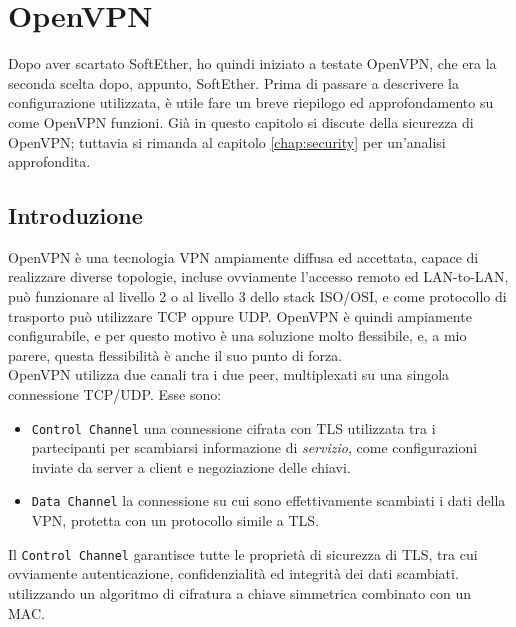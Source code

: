 \section{OpenVPN}
Dopo aver scartato SoftEther, ho quindi iniziato a testate OpenVPN, che era la
seconda scelta dopo, appunto, SoftEther. Prima di passare a descrivere la configurazione
utilizzata, è utile fare un breve riepilogo ed approfondamento su come OpenVPN
funzioni. Già in questo capitolo si discute della sicurezza di OpenVPN; tuttavia
si rimanda al capitolo \ref{chap:security} per un'analisi approfondita.

\subsection{Introduzione}
OpenVPN è una tecnologia VPN ampiamente diffusa ed accettata, capace di realizzare
diverse topologie, incluse ovviamente l'accesso remoto ed LAN-to-LAN, può funzionare
al livello 2 o al livello 3 dello stack ISO/OSI, e come protocollo di trasporto
può utilizzare TCP oppure UDP. OpenVPN è quindi ampiamente configurabile, e per questo
motivo è una soluzione molto flessibile, e, a mio parere, questa flessibilità è anche
il suo punto di forza.\\
OpenVPN utilizza due canali tra i due peer, multiplexati su una singola connessione
TCP/UDP. Esse sono:
\begin{itemize}
	\item \texttt{Control Channel} una connessione cifrata con TLS utilizzata tra i
	      partecipanti per scambiarsi informazione di \textit{servizio}, come configurazioni
	      inviate da server a client e negoziazione delle chiavi.
	\item \texttt{Data Channel} la connessione su cui sono effettivamente scambiati
	      i dati della VPN, protetta con un protocollo simile a TLS.
\end{itemize}
Il \texttt{Control Channel} garantisce tutte le proprietà di sicurezza di TLS,
tra cui ovviamente autenticazione, confidenzialità ed integrità
dei dati scambiati.
utilizzando un algoritmo di cifratura a chiave simmetrica combinato
con un MAC.

